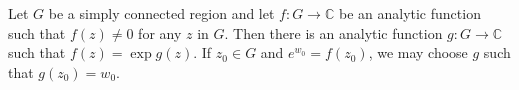 Let $G$ be a simply connected region and let $f: G \rightarrow \mathbb{C}$ be an analytic function such that $f(z) \neq 0$ for any $z$ in $G$. Then there is an analytic function $g: G \rightarrow \mathbb{C}$ such that $f(z) = \exp g(z)$. If $z_0 \in G$ and $e^{w_0} = f(z_0)$, we may choose $g$ such that $g(z_0) = w_0$.
